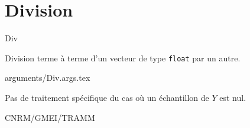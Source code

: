%
\section{Division}

 {\sf Div}

\bigskip
{}
Division terme \`a terme d'un vecteur de type {\tt float} par un autre.

\bigskip
 {arguments/Div.args.tex}

\bigskip
{}



\bigskip
{}

Pas de traitement sp\'ecifique du cas o\`u un \'echantillon de $Y$ est nul.

\bigskip
{}
CNRM/GMEI/TRAMM

\bigskip
{}
